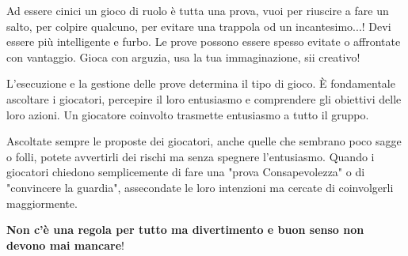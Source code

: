 \begin{multicols}{2}
\begin{changemargin}{0.3cm}{0.3cm}\begin{tcolorbox}[title = Prove Prove e Prove!]
		Ad essere cinici un gioco di ruolo è tutta una prova, vuoi per riuscire a fare un salto, per colpire qualcuno, per evitare una trappola od un incantesimo...!
		Devi essere più intelligente e furbo. Le prove possono essere spesso evitate o affrontate con vantaggio. Gioca con arguzia, usa la tua immaginazione, sii creativo!
\end{tcolorbox}\end{changemargin}

%


\begin{changemargin}{0.3cm}{0.3cm}\begin{narratore}
L'esecuzione e la gestione delle prove determina il tipo di gioco. È fondamentale ascoltare i giocatori, percepire il loro entusiasmo e comprendere gli obiettivi delle loro azioni. Un giocatore coinvolto trasmette entusiasmo a tutto il gruppo.

Ascoltate sempre le proposte dei giocatori, anche quelle che sembrano poco sagge o folli, potete avvertirli dei rischi ma senza spegnere l'entusiasmo. Quando i giocatori chiedono semplicemente di fare una "prova Consapevolezza" o di "convincere la guardia", assecondate le loro intenzioni ma cercate di coinvolgerli maggiormente.

\textbf{Non c'è una regola per tutto ma divertimento e buon senso non devono mai mancare}!
\end{narratore}\end{changemargin}

\end{multicols}

\pagebreak

